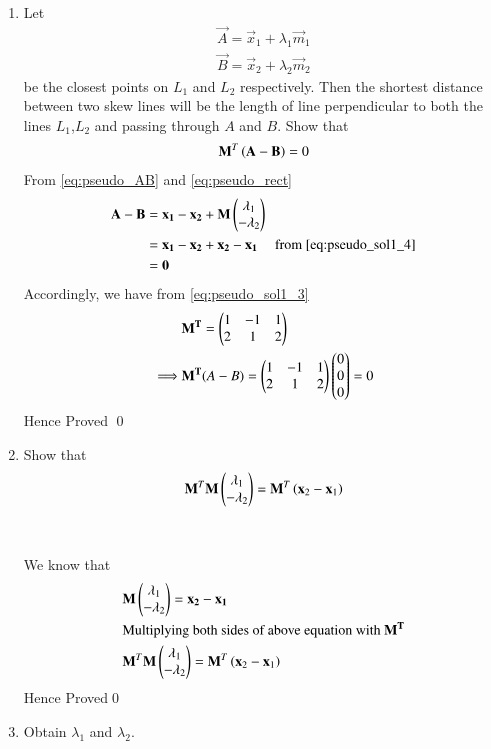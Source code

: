 \documentclass[journal,12pt,twocolumn]{IEEEtran}
\renewcommand\thesection{\arabic{section}}
\begin{document}
\begin{enumerate}[label=\thesection.\arabic*.,ref=\thesection.\theenumi]
\item Let 
\begin{align}
\vec{A}=\vec{x}_1 + \lambda_1 \vec{m}_1
\\
\vec{B}=\vec{x}_2 + \lambda_2 \vec{m}_2
\label{eq:pseudo_AB}
\end{align}
be the closest points on $L_1$ and $L_2$ respectively.  Then the shortest distance between two skew lines 
will be the length of line perpendicular to both the lines $L_1$,$L_2$ and passing through $A$ and $B$.
Show that 
\begin{align}
\mathbf{M}^T\left(\mathbf{A}-\mathbf{B}\right) = 0
\label{eq:pseudo:MAB}
\end{align}
From \eqref{eq:pseudo_AB} and \eqref{eq:pseudo_rect}
\begin{align*}
    \mathbf{A-B}&=\mathbf{x_1-x_2}+\mathbf{M}\begin{pmatrix}\lambda_1\\ -\lambda_2\end{pmatrix}\\
    &=\mathbf{x_1-x_2}+\mathbf{x_2-x_1}~~~~~\text{from \eqref{eq:pseudo_sol1_4}}\\
    &=\mathbf{0}
\end{align*}
Accordingly, we have from \eqref{eq:pseudo_sol1_3}
\begin{align*}
& \mathbf{M^T}=\begin{pmatrix}1 & -1 & 1\\2& 1 & 2\end{pmatrix}\ \\
\implies &\mathbf{M^T}(A-B)=\begin{pmatrix}1 & -1 & 1\\2& 1 & 2\end{pmatrix}\begin{pmatrix}0 \\ 0 \\ 0\end{pmatrix}=0
\end{align*}
Hence Proved \qed
\item Show that
\begin{align}
    \mathbf{M}^T\mathbf{M}\begin{pmatrix}\lambda_1\\-\lambda_2\end{pmatrix} = \mathbf{M}^T\left(\mathbf{x}_2-\mathbf{x}_1\right)
\label{eq:pseudo_ls}
\end{align}\\
\solution\\
We know that 
\begin{align*}
& \mathbf{M}\begin{pmatrix}\lambda_1\\ -\lambda_2\end{pmatrix}=\mathbf{x_2-x_1}\\
& \text{Multiplying both sides of above equation with $\mathbf{M^T}$}\\
&  \mathbf{M}^T\mathbf{M}\begin{pmatrix}\lambda_1\\-\lambda_2\end{pmatrix} = \mathbf{M}^T\left(\mathbf{x}_2-\mathbf{x}_1\right)
\end{align*}
Hence Proved\qed
\item Obtain $\lambda_1$ and $\lambda_2$.\\

\end{enumerate}
\end{document}
